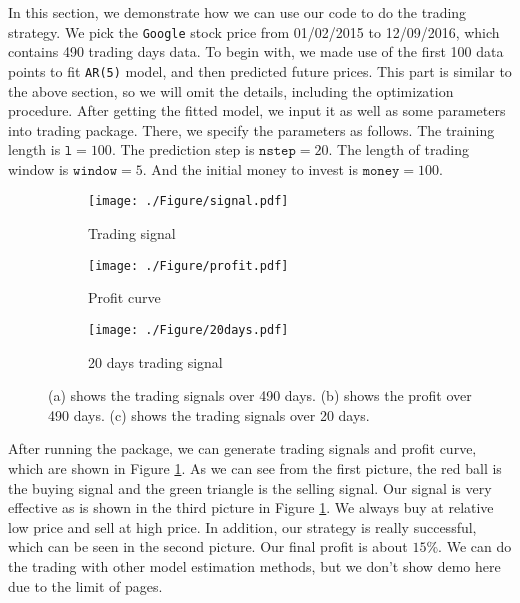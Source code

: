 In this section, we demonstrate how we can use our code to do the trading strategy. We pick the  \texttt{Google} stock price from 01/02/2015 to 12/09/2016, which contains 490 trading days data. To begin with,  we made use of the first 100 data points to fit \texttt{AR(5)} model, and then predicted future prices. This part is similar to the above section, so we will omit the details, including the optimization procedure. After getting the fitted model, we input it as well as some parameters into trading package. There, we specify the parameters as follows. The training length is $\texttt{l}=100$. The prediction step is $\texttt{nstep}=20$. The length of trading window is $\texttt{window}=5$. And the initial money to invest is $\texttt{money}=100$. 
\begin{figure}[h]
	\centering
	\begin{subfigure}[t]{0.32\linewidth}
		\centering
		\texttt{[image: ./Figure/signal.pdf]}
		\caption{Trading signal}
	\end{subfigure}
	\begin{subfigure}[t]{0.32 \linewidth}
		\centering
		\texttt{[image: ./Figure/profit.pdf]} 
		\caption{Profit curve}
	\end{subfigure}
	\begin{subfigure}[t]{0.32\linewidth}
		\centering
		\texttt{[image: ./Figure/20days.pdf]} 
		\caption{20 days trading signal}
	\end{subfigure}
	\caption{(a) shows the trading signals over 490 days. (b) shows the profit over 490 days. (c) shows the trading signals over 20 days. }
	\label{fig:trading}
\end{figure}

After running the package, we can generate trading signals and profit curve, which are shown in Figure \ref{fig:trading}. As we can see from the first picture, the red ball is the buying signal and the green triangle is the selling signal. Our signal is very effective as is shown in the third picture in Figure \ref{fig:trading}. We always buy at relative low price and sell at high price. In addition, our strategy is really successful, which can be seen in the second picture. Our final profit is about $15 \%$. We can do the trading with other model estimation methods, but we don't show demo here due to the limit of pages.